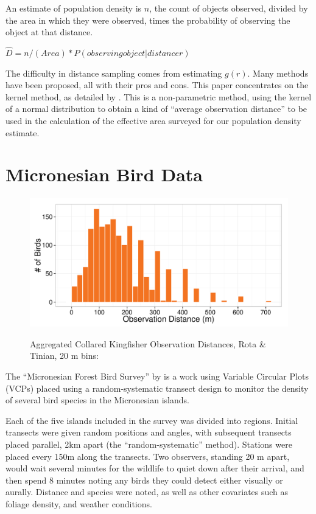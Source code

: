 \documentclass[12pt]{article}
\begin{document}
An estimate of population density is $n$, the count of objects observed, divided by the area in which they were observed, times the probability of observing the object at that distance. \cite{buckland2001} %

$\hat{D}=n/(Area)*P(observing object|distance r)$

The difficulty in distance sampling comes from estimating $g(r)$. Many methods have been proposed, all with their pros and cons. This paper concentrates on the kernel method, as detailed by \textcite{quang1993}. This is a non-parametric method, using the kernel of a normal distribution to obtain a kind of ``average observation distance'' to be used in the calculation of the effective area surveyed for our population density estimate.

\section{Micronesian Bird Data}
\begin{figure}
	\caption{Aggregated Collared Kingfisher Observation Distances, Rota \& Tinian, 20 m bins: \cite{micronesian}}
	\includegraphics[width=\textwidth]{../images/histogram_dist_20m.pdf}
	\label{fig:82dist}
\end{figure}
The ``Micronesian Forest Bird Survey'' by \textcite{micronesian} is a work using Variable Circular Plots (VCPs) placed using a random-systematic transect design to monitor the density of several bird species in the Micronesian islands.

Each of the five islands included in the survey was divided into regions. Initial transects were given random positions and angles, with subsequent transects placed parallel, 2km apart (the ``random-systematic'' method). Stations were placed every 150m along the transects. Two observers, standing 20 m apart, would wait several minutes for the wildlife to quiet down after their arrival, and then spend 8 minutes noting any birds they could detect either visually or aurally. Distance and species were noted, as well as other covariates such as foliage density, and weather conditions. 
\end{document}
